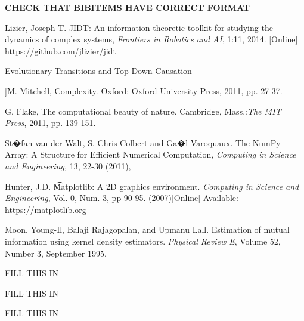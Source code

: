 \documentclass[conference]{IEEEtran}
\begin{document}
%
%
%
{\bf CHECK THAT BIBITEMS HAVE CORRECT FORMAT }
\begin{thebibliography}{1}
  
  Lizier, Joseph T. 
  JIDT: An information-theoretic toolkit for studying the dynamics of complex systems, {\it Frontiers in Robotics and AI}, 1:11, 2014. [Online]  
  https://github.com/jlizier/jidt

 Evolutionary Transitions and Top-Down Causation

 ]M. Mitchell, Complexity. Oxford: Oxford University Press, 2011, pp. 27-37.

 G. Flake, The computational beauty of nature. Cambridge, Mass.:{\it  The MIT Press}, 2011, pp. 139-151.

 St�fan van der Walt, S. Chris Colbert and Ga�l Varoquaux. The NumPy Array: A Structure for Efficient Numerical Computation, {\it Computing in Science and Engineering,} 13, 22-30 (2011),

 Hunter, J.D. {\t Matplotlib: A 2D graphics environment}.  {\it Computing in Science and Engineering}, Vol. 0, Num. 3, pp 90-95.  (2007)[Online]
Available: https://matplotlib.org

Moon, Young-Il, Balaji Rajagopalan, and Upmanu Lall.  Estimation of mutual information using kernel density estimators.  {\it Physical Review E}, Volume 52, Number 3, September 1995.  


 FILL THIS IN

 FILL THIS IN

 FILL THIS IN
\end{thebibliography}




\end{document}
